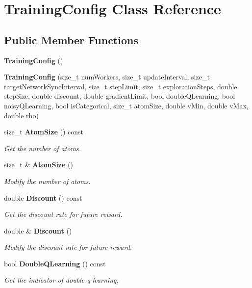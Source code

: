 \section{Training\+Config Class Reference}
\label{classmlpack_1_1rl_1_1TrainingConfig}
\subsection*{Public Member Functions}
\begin{DoxyCompactItemize}
\item 
\textbf{ Training\+Config} ()
\item 
\textbf{ Training\+Config} (size\+\_\+t num\+Workers, size\+\_\+t update\+Interval, size\+\_\+t target\+Network\+Sync\+Interval, size\+\_\+t step\+Limit, size\+\_\+t exploration\+Steps, double step\+Size, double discount, double gradient\+Limit, bool double\+Q\+Learning, bool noisy\+Q\+Learning, bool is\+Categorical, size\+\_\+t atom\+Size, double v\+Min, double v\+Max, double rho)
\item 
size\+\_\+t \textbf{ Atom\+Size} () const
\begin{DoxyCompactList}\small\item\em Get the number of atoms. \end{DoxyCompactList}\item 
size\+\_\+t \& \textbf{ Atom\+Size} ()
\begin{DoxyCompactList}\small\item\em Modify the number of atoms. \end{DoxyCompactList}\item 
double \textbf{ Discount} () const
\begin{DoxyCompactList}\small\item\em Get the discount rate for future reward. \end{DoxyCompactList}\item 
double \& \textbf{ Discount} ()
\begin{DoxyCompactList}\small\item\em Modify the discount rate for future reward. \end{DoxyCompactList}\item 
bool \textbf{ Double\+Q\+Learning} () const
\begin{DoxyCompactList}\small\item\em Get the indicator of double q-\/learning. \end{DoxyCompactList}\item 

\end{DoxyCompactItemize}
